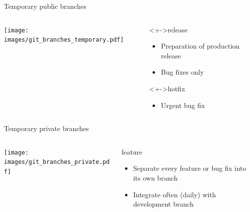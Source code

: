 \documentclass{beamer}
\begin{document}
\begin{frame}{Temporary public branches}
  \begin{columns}
    \begin{column}{6cm}
      \begin{center}
        \texttt{[image: images/git\_branches\_temporary.pdf]}
      \end{center}
    \end{column}
    \begin{column}{5cm}
      \begin{block}<+->{release}
        \begin{itemize}
        \item Preparation of production release
        \item Bug fixes \alert{only}
        \end{itemize}
      \end{block}
      \begin{block}<+->{hotfix}
        \begin{itemize}
        \item Urgent bug fix
        \end{itemize}
      \end{block}
    \end{column}
  \end{columns}
\end{frame}

\begin{frame}{Temporary private branches}
  \begin{columns}
    \begin{column}{6cm}
      \begin{center}
        \texttt{[image: images/git\_branches\_private.pdf]}
      \end{center}
    \end{column}
    \begin{column}{5cm}
      \begin{block}{feature}
        \begin{itemize}
        \item Separate every feature or bug fix into its own branch
        \item Integrate often (daily) with development branch
        \end{itemize}
      \end{block}
    \end{column}
  \end{columns}
\end{frame}
\end{document}

